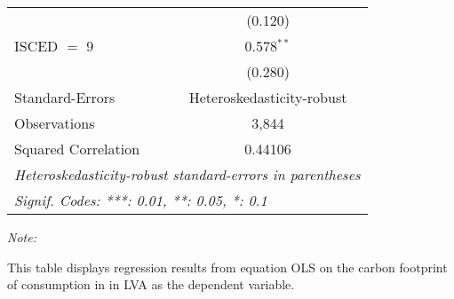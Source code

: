 \begin{table}[htbp!]
\begin{adjustbox}{width = 1\textwidth, max height = 0.95\textheight, center}
\begin{threeparttable}[b]
\begin{tabular}{lc}
                                & (0.120)\\   
            ISCED $=$ 9         & 0.578$^{**}$\\   
                                & (0.280)\\   
            \midrule 
            Standard-Errors     & Heteroskedasticity-robust \\   
            Observations        & 3,844\\  
            Squared Correlation & 0.44106\\  
            \midrule \midrule
            \multicolumn{2}{l}{\emph{Heteroskedasticity-robust standard-errors in parentheses}}\\
            \multicolumn{2}{l}{\emph{Signif. Codes: ***: 0.01, **: 0.05, *: 0.1}}\\
         \end{tabular}
         
         \begin{tablenotes}\item \medskip \textit{Note:}
            \item This table displays regression results from equation OLS on the carbon footprint of consumption in  in LVA as the dependent variable.  
         \end{tablenotes}
      \end{threeparttable}
   \end{adjustbox}
\end{table}


